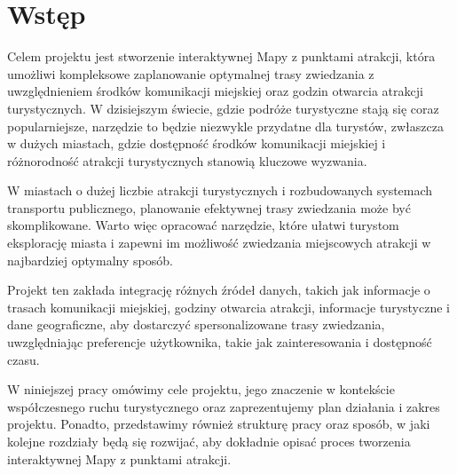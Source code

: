 
\chapter{Wstęp}
\label{ch:wstep}

Celem projektu jest stworzenie interaktywnej Mapy z punktami atrakcji, która umożliwi kompleksowe zaplanowanie optymalnej trasy zwiedzania z uwzględnieniem środków komunikacji miejskiej oraz godzin otwarcia atrakcji turystycznych. W dzisiejszym świecie, gdzie podróże turystyczne stają się coraz popularniejsze, narzędzie to będzie niezwykle przydatne dla turystów, zwłaszcza w dużych miastach, gdzie dostępność środków komunikacji miejskiej i różnorodność atrakcji turystycznych stanowią kluczowe wyzwania.

W miastach o dużej liczbie atrakcji turystycznych i rozbudowanych systemach transportu publicznego, planowanie efektywnej trasy zwiedzania może być skomplikowane. Warto więc opracować narzędzie, które ułatwi turystom eksplorację miasta i zapewni im możliwość zwiedzania miejscowych atrakcji w najbardziej optymalny sposób.

Projekt ten zakłada integrację różnych źródeł danych, takich jak informacje o trasach komunikacji miejskiej, godziny otwarcia atrakcji, informacje turystyczne i dane geograficzne, aby dostarczyć spersonalizowane trasy zwiedzania, uwzględniając preferencje użytkownika, takie jak zainteresowania i dostępność czasu.

W niniejszej pracy omówimy cele projektu, jego znaczenie w kontekście współczesnego ruchu turystycznego oraz zaprezentujemy plan działania i zakres projektu. Ponadto, przedstawimy również strukturę pracy oraz sposób, w jaki kolejne rozdziały będą się rozwijać, aby dokładnie opisać proces tworzenia interaktywnej Mapy z punktami atrakcji.
